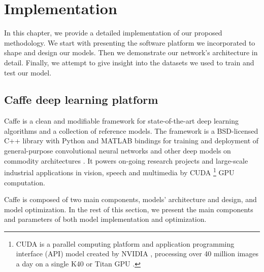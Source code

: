 
\chapter{Implementation}
\label{sec:implementation}
\noindent

\noindent In this chapter, we provide a detailed implementation of our proposed methodology. We start with presenting the software platform we incorporated to shape and design our models. Then we demonstrate our network's architecture in detail. Finally, we attempt to give insight into the datasets we used to train and test our model. 

\section{Caffe deep learning platform}

Caffe is a clean and modifiable framework for state-of-the-art deep learning algorithms and a collection of reference models. The framework is a BSD-licensed C++ library with Python and MATLAB bindings for training and deployment of general-purpose convolutional neural networks and other deep models on commodity architectures \cite{jia2014caffe}. It powers on-going research projects and large-scale industrial applications in vision, speech and multimedia by CUDA \footnote{CUDA is a parallel computing platform and application programming interface (API) model created by NVIDIA \cite{cuda}, processing over 40 million images a day on a single K40 or Titan GPU \cite{jia2014caffe}.}  GPU computation.

Caffe is composed of two main components, models' architecture and design, and model optimization. In the rest of this section, we present the main components and parameters of both model implementation and optimization.
